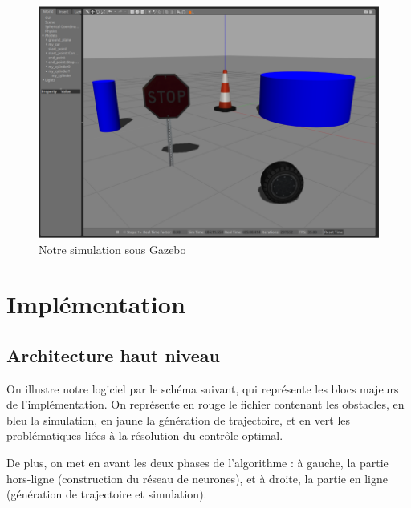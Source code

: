 \documentclass[a4paper,12pt]{report}
\begin{document}
\begin{figure}[!htb]
\centering
\includegraphics[width=14cm]{gzclient.png}
\caption{Notre simulation sous Gazebo}
\end{figure}








\newpage
\section{Implémentation}
\subsection{Architecture haut niveau}

On illustre notre logiciel par le schéma suivant, qui représente les blocs majeurs de l'implémentation. On représente en rouge le fichier contenant les obstacles, en bleu la simulation, en jaune la génération de trajectoire, et en vert les problématiques liées à la résolution du contrôle optimal.

De plus, on met en avant les deux phases de l'algorithme : à gauche, la partie hors-ligne (construction du réseau de neurones), et à droite, la partie en ligne (génération de trajectoire et simulation).
\end{document}
